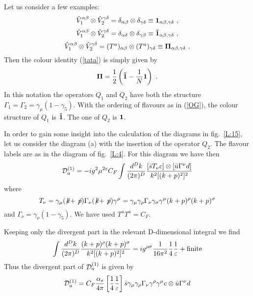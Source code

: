 \documentclass[12pt]{article}
\def\as{\alpha_s}
\newcommand{\be}{\begin{equation}}
\newcommand{\ee}{\end{equation}}
\begin{document}
\begin{itemize}
\begin{itemize}
\begin{itemize}
Let us consider a few examples:
\be\label{V1}
\hat V_1^{\alpha\beta}\otimes\hat V_2^{\gamma\delta}=
\delta_{\alpha\beta}\otimes\delta_{\gamma\delta}
\equiv{\bf 1}_{\alpha\beta,\gamma\delta}~,
\ee
\be\label{V2}
\hat V_1^{\alpha\beta}\otimes\hat V_2^{\gamma\delta}=
\delta_{\alpha\delta}\otimes\delta_{\gamma\beta}
\equiv{\bf\tilde 1}_{\alpha\beta,\gamma\delta}~,
\ee
\be\label{V3}
\hat V_1^{\alpha\beta}\otimes\hat V_2^{\gamma\delta}=
(T^a)_{\alpha\beta}\otimes(T^a)_{\gamma\delta}
\equiv{\bf \Pi}_{\alpha\beta,\gamma\delta}~.
\ee
Then the colour identity (\ref{tata}) is simply given by
\be\label{CI}
{\bf \Pi}=\frac{1}{2}\left({\bf \tilde 1}-\frac{1}{N}{\bf 1}\right)~.
\ee
In this notation the operators $Q_1$ and $Q_2$ have both the
structure $\Gamma_1=\Gamma_2=\gamma_\mu(1-\gamma_5)$. With the
ordering of flavours as in (\ref{OG}), the colour structure of
$Q_1$ is ${\bf\tilde 1}$. The one of $Q_2$ is ${\bf 1}$.

In order to gain some insight into the calculation of the diagrams
in fig.~\ref{L:15}, let us consider the diagram (a) with the insertion
of the operator $Q_2$. The flavour labels are as in the diagram of
fig.~\ref{L:4}. 
For this diagram we have then
\be\label{DIAG}  
{\cal D}_a^{(1)}=-i g^2\mu^{2\varepsilon} C_F
\int \frac{d^D k}{(2\pi)^D}
\frac{[\bar s T_\nu c]\otimes[\bar u \Gamma^\nu d]}
{k^2[(k+p)^2]^2}
\ee
where
\be\label{TNU}
T_\nu=\gamma_\mu(\not\! k+\not\! p)\Gamma_\nu (\not\! k+\not\! p)\gamma^\mu
=\gamma_\mu\gamma_\rho\Gamma_\nu\gamma_\sigma\gamma^\mu
(k+p)^\rho (k+p)^\sigma
\ee
and $\Gamma_\nu=\gamma_\nu(1-\gamma_5)$. We have used $T^a T^a=C_F$.

Keeping only the divergent part in the relevant D-dimensional integral
we find
\be\label{INTR}
\int \frac{d^D k}{(2\pi)^D}
\frac{(k+p)^\rho (k+p)^\sigma}
{k^2[(k+p)^2]^2}=i g^{\rho\sigma} \frac{1}{16\pi^2}\frac{1}{4}
\frac{1}{\varepsilon}+{\rm finite}
\ee
Thus the divergent part of ${\cal D}_a^{(1)}$ is given by
\be\label{DADIV}
{\cal D}_a^{(1)}=C_F\frac{\as}{4\pi}
\left[\frac{1}{4}\frac{1}{\varepsilon}\right]
\bar s\gamma_\mu\gamma_\rho\Gamma_\nu\gamma^\rho\gamma^\mu c\otimes
\bar u \Gamma^\nu d
\ee


\end{itemize}
\end{itemize}
\end{itemize}
\end{document}
